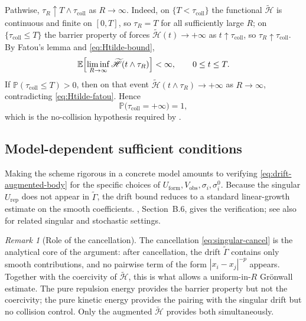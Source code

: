 \documentclass[pdflatex,sn-mathphys-num]{sn-jnl}%
\numberwithin{equation}{section}
\theoremstyle{thmstyleone}%
\theoremstyle{remark}
\newtheorem{remark}{Remark}
\theoremstyle{definition}
\newcommand{\E}{\mathbb{E}}
\newcommand{\Prob}{\mathbb{P}}
\begin{document}
Pathwise, $\tau_R\uparrow T\wedge\tau_{\mathrm{coll}}$ as $R\to\infty$.
Indeed, on $\{T<\tau_{\mathrm{coll}}\}$ the functional
$\widetilde{\mathscr H}$ is continuous and finite on $[0,T]$, so $\tau_R=T$
for all sufficiently large $R$; on $\{\tau_{\mathrm{coll}}\le T\}$ the
barrier property of  forces
$\widetilde{\mathscr H}(t)\to+\infty$ as $t\uparrow\tau_{\mathrm{coll}}$,
so $\tau_R\uparrow\tau_{\mathrm{coll}}$. By Fatou's lemma and
\eqref{eq:Htilde-bound},
\begin{equation}\label{eq:Htilde-fatou}
  \E\Bigl[\liminf_{R\to\infty}\widetilde{\mathscr H}(t\wedge\tau_R)\Bigr] <\infty,
  \qquad 0\le t\le T.
\end{equation}
If $\Prob(\tau_{\mathrm{coll}}\le T)>0$, then on that event
$\widetilde{\mathscr H}(t\wedge\tau_R)\to+\infty$ as $R\to\infty$,
contradicting \eqref{eq:Htilde-fatou}. Hence
\begin{equation}\label{eq:no-collision}
  \Prob\bigl(\tau_{\mathrm{coll}} = +\infty\bigr) = 1,
\end{equation}
which is the no-collision hypothesis required by .

\subsection{Model-dependent sufficient conditions}
\label{subsec:model-dependent}

Making the scheme rigorous in a concrete model amounts to verifying
\eqref{eq:drift-augmented-body} for the specific choices of
$U_{\mathrm{form}},V_{\mathrm{obs}},\sigma_i,\sigma_i^0$. Because the
singular $U_{\mathrm{rep}}$ does not appear in $\widetilde{\Gamma}$, the
drift bound reduces to a standard linear-growth estimate on the smooth
coefficients. , Section~B.6, gives the
verification; see also
\cite{cucker2010avoiding,carrillo2017sharp,ha2009emergence,ahn2010stochastic}
for related singular and stochastic settings.

\begin{remark}[Role of the cancellation]
\label{rem:cancellation}
The cancellation \eqref{eq:singular-cancel} is the analytical core of the
argument: after cancellation, the drift $\widetilde\Gamma$ contains only
smooth contributions, and no pairwise term of the form
$|x_i-x_j|^{-p}$ appears. Together with the coercivity of
$\widetilde{\mathscr H}$, this is what allows a uniform-in-$R$ Gr\"onwall
estimate. The pure repulsion energy provides the barrier property but not
the coercivity; the pure kinetic energy provides the pairing with the
singular drift but no collision control. Only the augmented
$\widetilde{\mathscr H}$ provides both simultaneously.
\end{remark}
\end{document}
